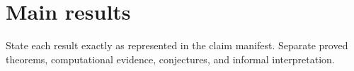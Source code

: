 \section{Main results}
State each result exactly as represented in the claim manifest. Separate proved theorems, computational evidence, conjectures, and informal interpretation.
